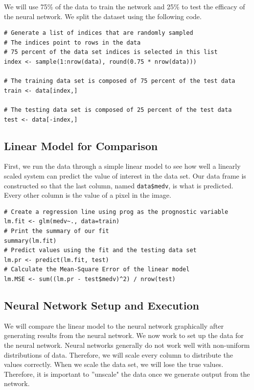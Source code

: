 \documentclass[11pt]{article}
\begin{document}
We will use 75\% of the data to train the network and 25\% to test the efficacy of the neural network. We split the dataset using the following code.

\begin{lstlisting}
# Generate a list of indices that are randomly sampled
# The indices point to rows in the data
# 75 percent of the data set indices is selected in this list
index <- sample(1:nrow(data), round(0.75 * nrow(data)))

# The training data set is composed of 75 percent of the test data
train <- data[index,]

# The testing data set is composed of 25 percent of the test data
test <- data[-index,]
\end{lstlisting}

\subsection{Linear Model for Comparison}

First, we run the data through a simple linear model to see how well a linearly scaled system can predict the value of interest in the data set. Our data frame is constructed so that the last column, named \verb|data$medv|, is what is predicted. Every other column is the value of a pixel in the image.

\begin{lstlisting}
# Create a regression line using prog as the prognostic variable
lm.fit <- glm(medv~., data=train)
# Print the summary of our fit
summary(lm.fit)
# Predict values using the fit and the testing data set
lm.pr <- predict(lm.fit, test)
# Calculate the Mean-Square Error of the linear model
lm.MSE <- sum((lm.pr - test$medv)^2) / nrow(test)
\end{lstlisting}

\subsection{Neural Network Setup and Execution}

We will compare the linear model to the neural network graphically after generating results from the neural network. We now work to set up the data for the neural network. Neural networks generally do not work well with non-uniform distributions of data. Therefore, we will scale every column to distribute the values correctly. When we scale the data set, we will lose the true values. Therefore, it is important to ''unscale" the data once we generate output from the network.
\end{document}
